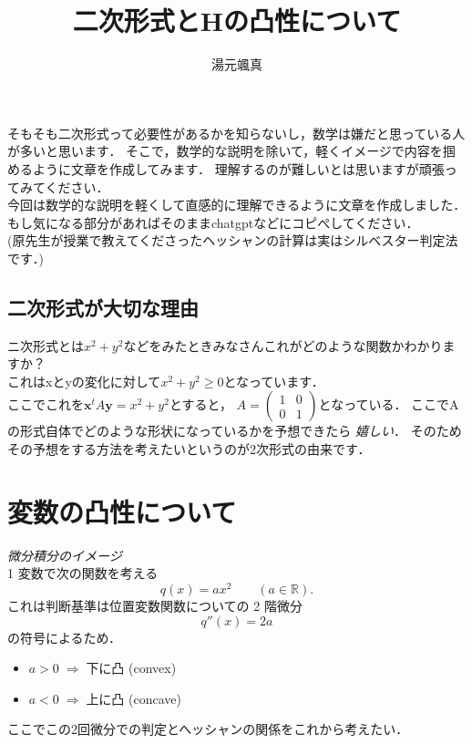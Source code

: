 \documentclass[11pt]{jsarticle}
\title{二次形式とHの凸性について}
\author{湯元颯真}
\date{}
\begin{document}
\maketitle

  そもそも二次形式って必要性があるかを知らないし，数学は嫌だと思っている人が多いと思います．
  そこで，数学的な説明を除いて，軽くイメージで内容を掴めるように文章を作成してみます．
理解するのが難しいとは思いますが頑張ってみてください．\\
今回は数学的な説明を軽くして直感的に理解できるように文章を作成しました．
もし気になる部分があればそのままchatgptなどにコピぺしてください．\\
(原先生が授業で教えてくださったヘッシャンの計算は実はシルベスター判定法です．)

\subsection{二次形式が大切な理由}
  ニ次形式とは\(x^2 + y^{2}\)などをみたときみなさんこれがどのような関数かわかりますか？\\
  これはxとyの変化に対して\(x^2  + y^{2} \geq 0\)となっています．\\
  ここでこれを\( \mathbf{x}^{t} A \mathbf{y} = x^2 + y^{2} \)とすると，
  \(
  A = \begin{pmatrix} 1 & 0\\ 0 & 1 \end{pmatrix} 
  \)となっている．
  ここでAの形式自体でどのような形状になっているかを予想できたら \emph{嬉しい}．
  そのためその予想をする方法を考えたいというのが2次形式の由来です．
    
  
\section{変数の凸性について}


\emph{微分積分のイメージ}\\
1 変数で次の関数を考える
\[
  q(x)=ax^{2}\qquad(a\in\mathbb R).
\]
これは判断基準は位置変数関数についての 2 階微分
\[
  q''(x)=2a
\]
の符号によるため．
\begin{itemize}
  \item \(a>0 \;\Rightarrow\; \textbf{下に凸}\) (convex)
  \item \(a<0 \;\Rightarrow\; \textbf{上に凸}\) (concave)
\end{itemize}
ここでこの2回微分での判定とへッシャンの関係をこれから考えたい．
\end{document}
